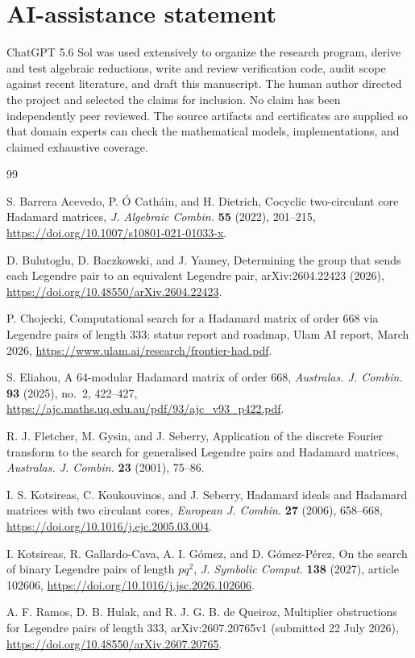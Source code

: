 \documentclass[11pt]{article}
\theoremstyle{remark}
\begin{document}
\section*{AI-assistance statement}

ChatGPT 5.6 Sol was used extensively to organize the research program,
derive and test algebraic reductions, write and review verification code,
audit scope against recent literature, and draft this manuscript.  The
human author directed the project and selected the claims for inclusion.
No claim has been independently peer reviewed.  The source artifacts and
certificates are supplied so that domain experts can check the mathematical
models, implementations, and claimed exhaustive coverage.

\begin{thebibliography}{99}

S. Barrera Acevedo, P. \'{O} Cath\'ain, and H. Dietrich,
\newblock Cocyclic two-circulant core Hadamard matrices,
\newblock \emph{J. Algebraic Combin.} \textbf{55} (2022), 201--215,
\newblock \url{https://doi.org/10.1007/s10801-021-01033-x}.

D. Bulutoglu, D. Baczkowski, and J. Yauney,
\newblock Determining the group that sends each Legendre pair to an
equivalent Legendre pair,
\newblock arXiv:2604.22423 (2026),
\newblock \url{https://doi.org/10.48550/arXiv.2604.22423}.

P. Chojecki,
\newblock Computational search for a Hadamard matrix of order 668 via
Legendre pairs of length 333: status report and roadmap,
\newblock Ulam AI report, March 2026,
\newblock \url{https://www.ulam.ai/research/frontier-had.pdf}.

S. Eliahou,
\newblock A 64-modular Hadamard matrix of order 668,
\newblock \emph{Australas. J. Combin.} \textbf{93} (2025), no.~2,
422--427,
\newblock \url{https://ajc.maths.uq.edu.au/pdf/93/ajc_v93_p422.pdf}.

R. J. Fletcher, M. Gysin, and J. Seberry,
\newblock Application of the discrete Fourier transform to the search for
generalised Legendre pairs and Hadamard matrices,
\newblock \emph{Australas. J. Combin.} \textbf{23} (2001), 75--86.

I. S. Kotsireas, C. Koukouvinos, and J. Seberry,
\newblock Hadamard ideals and Hadamard matrices with two circulant cores,
\newblock \emph{European J. Combin.} \textbf{27} (2006), 658--668,
\newblock \url{https://doi.org/10.1016/j.ejc.2005.03.004}.

I. Kotsireas, R. Gallardo-Cava, A. I. G\'omez, and D. G\'omez-P\'erez,
\newblock On the search of binary Legendre pairs of length $pq^2$,
\newblock \emph{J. Symbolic Comput.} \textbf{138} (2027), article 102606,
\newblock \url{https://doi.org/10.1016/j.jsc.2026.102606}.

A. F. Ramos, D. B. Hulak, and R. J. G. B. de Queiroz,
\newblock Multiplier obstructions for Legendre pairs of length 333,
\newblock arXiv:2607.20765v1 (submitted 22 July 2026),
\newblock \url{https://doi.org/10.48550/arXiv.2607.20765}.

\end{thebibliography}
\end{document}
